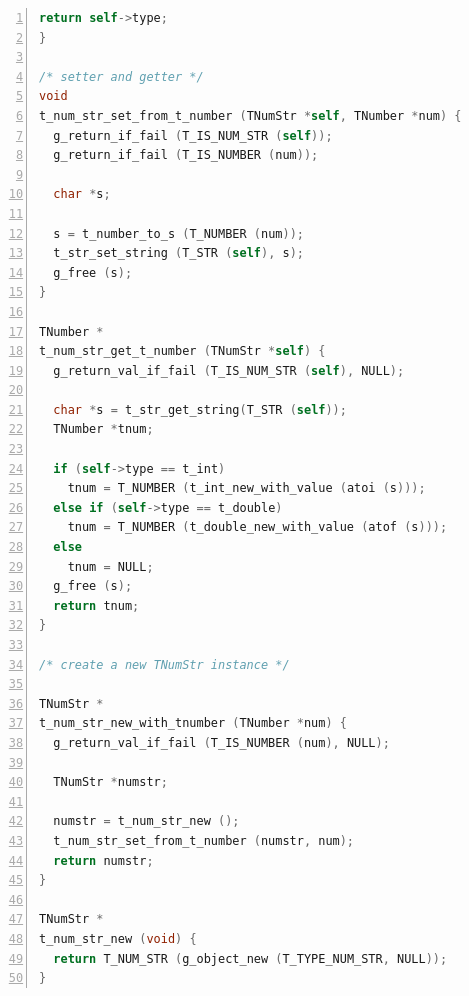 \begin{lstlisting}[language=C, numbers=left]
  return self->type;
}

/* setter and getter */
void
t_num_str_set_from_t_number (TNumStr *self, TNumber *num) {
  g_return_if_fail (T_IS_NUM_STR (self));
  g_return_if_fail (T_IS_NUMBER (num));

  char *s;

  s = t_number_to_s (T_NUMBER (num));
  t_str_set_string (T_STR (self), s);
  g_free (s);
}

TNumber *
t_num_str_get_t_number (TNumStr *self) {
  g_return_val_if_fail (T_IS_NUM_STR (self), NULL);

  char *s = t_str_get_string(T_STR (self));
  TNumber *tnum;

  if (self->type == t_int)
    tnum = T_NUMBER (t_int_new_with_value (atoi (s)));
  else if (self->type == t_double)
    tnum = T_NUMBER (t_double_new_with_value (atof (s)));
  else
    tnum = NULL;
  g_free (s);
  return tnum;
}

/* create a new TNumStr instance */

TNumStr *
t_num_str_new_with_tnumber (TNumber *num) {
  g_return_val_if_fail (T_IS_NUMBER (num), NULL);

  TNumStr *numstr;

  numstr = t_num_str_new ();
  t_num_str_set_from_t_number (numstr, num);
  return numstr;
}

TNumStr *
t_num_str_new (void) {
  return T_NUM_STR (g_object_new (T_TYPE_NUM_STR, NULL));
}
\end{lstlisting}

